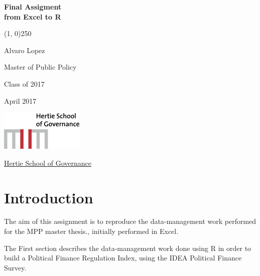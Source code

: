 \documentclass[12,twoside]{article}
\title{}
\author{}
\date{}
\begin{document}
\pagebreak

 \thispagestyle{empty}

\begin{centering}

\vspace{4 cm}

\Huge

{\bf Final Assigment \\ \Large from Excel to R}

\vspace{1 cm}
{\color{gray} \line(1, 0){250}}
\vspace{2 cm}

\Large
Alvaro Lopez

\normalsize
Master of Public Policy

Class of 2017

\vspace{2 cm}

April 2017

\vspace{3 cm}

\normalsize
\includegraphics[width=.23  \textwidth]{templates/logo.png}

\href{https://www.hertie-school.org/en/}{Hertie School of Governance} 

\end{centering}

\clearpage

\newpage

\thispagestyle{empty} \vspace{4 cm} \small

\normalsize
\clearpage
\newpage
\setcounter{page}{1}

\newpage

\section{Introduction}\label{intro}

The aim of this assignment is to reproduce the data-management work
performed for the MPP master thesis., initially performed in Excel.

The First section describes the data-management work done using R in
order to build a Political Finance Regulation Index, using the IDEA
Political Finance Survey.
\end{document}

